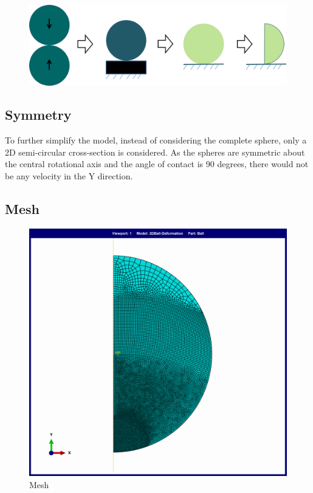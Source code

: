 \begin{figure}[H]
	\centering
	\includegraphics[scale=0.5]{../images/SimulationSetup/sphere2D.png}
\end{figure}
\subsection{Symmetry}
To further simplify the model, instead of considering the complete sphere, only a 2D semi-circular cross-section is considered. As the spheres are symmetric about the central rotational axis and the angle of contact is 90 degrees, there would not be any velocity in the Y direction. 

\subsection{Mesh}

\begin{figure}[H]
    \centering
	\includegraphics[scale=0.075]{../images/Mesh/Mesh.png}
	\caption{Mesh}
	\label{fig:mesh}
\end{figure}

